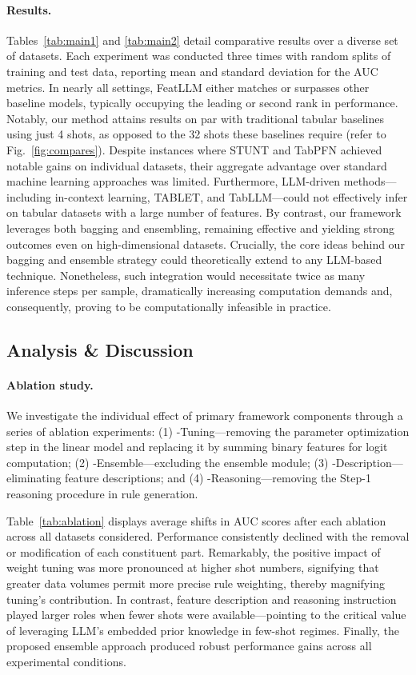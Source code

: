 \vspace*{-0.12in}
\paragraph{Results.}
Tables~\ref{tab:main1} and \ref{tab:main2} detail comparative results over a diverse set of datasets. Each experiment was conducted three times with random splits of training and test data, reporting mean and standard deviation for the AUC metrics. In nearly all settings, \textsf{FeatLLM} either matches or surpasses other baseline models, typically occupying the leading or second rank in performance. Notably, our method attains results on par with traditional tabular baselines using just 4 shots, as opposed to the 32 shots these baselines require (refer to Fig.~\ref{fig:compares}). Despite instances where STUNT and TabPFN achieved notable gains on individual datasets, their aggregate advantage over standard machine learning approaches was limited. Furthermore, LLM-driven methods—including in-context learning, TABLET, and TabLLM—could not effectively infer on tabular datasets with a large number of features. By contrast, our framework leverages both bagging and ensembling, remaining effective and yielding strong outcomes even on high-dimensional datasets. Crucially, the core ideas behind our bagging and ensemble strategy could theoretically extend to any LLM-based technique. Nonetheless, such integration would necessitate twice as many inference steps per sample, dramatically increasing computation demands and, consequently, proving to be computationally infeasible in practice.

\subsection{Analysis \& Discussion}
\label{sec:analysis}
\paragraph{Ablation study.} We investigate the individual effect of primary framework components through a series of ablation experiments: (1) \textsf{-Tuning}—removing the parameter optimization step in the linear model and replacing it by summing binary features for logit computation; (2) \textsf{-Ensemble}—excluding the ensemble module; (3) \textsf{-Description}—eliminating feature descriptions; and (4) \textsf{-Reasoning}—removing the Step-1 reasoning procedure in rule generation.

Table~\ref{tab:ablation} displays average shifts in AUC scores after each ablation across all datasets considered. Performance consistently declined with the removal or modification of each constituent part. Remarkably, the positive impact of weight tuning was more pronounced at higher shot numbers, signifying that greater data volumes permit more precise rule weighting, thereby magnifying tuning’s contribution. In contrast, feature description and reasoning instruction played larger roles when fewer shots were available—pointing to the critical value of leveraging LLM's embedded prior knowledge in few-shot regimes. Finally, the proposed ensemble approach produced robust performance gains across all experimental conditions.

